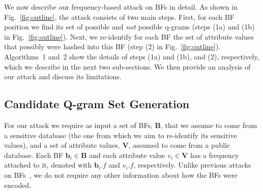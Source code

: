 \documentclass{llncs}
\begin{document}

We now describe our frequency-based attack on BFs in detail. As shown
in Fig.~\ref{fig:outline}, the attack consists of two main steps.
First, for each BF position we find its set of possible and
\emph{not} possible q-grams
(steps (1a) and (1b) in Fig.~\ref{fig:outline}).
%
Next, 
we re-identify for each BF  
the set of attribute values
that possibly were hashed into this BF (step (2) in
Fig.~\ref{fig:outline}).
%
Algorithms~1 and~2 show the details of steps (1a) and (1b), and (2),
respectively, which we describe in the next two sub-sections. We then
provide an analysis of our attack and discuss its limitations.


\subsection{Candidate Q-gram Set Generation}
\label{sec-cand-q-gram}

For our attack we require as input a set of BFs, $\mathbf{B}$, that
we assume to come from a sensitive database (the one from which we
aim to re-identify its sensitive values), and a set of attribute
values, $\mathbf{V}$, assumed to come from a public database. Each BF
$\mathbf{b}_i \in \mathbf{B}$ and each attribute value $v_i \in
\mathbf{V}$ has a frequency attached to it, denoted with
$\mathbf{b}_i.f$ and $v_i.f$, respectively. Unlike previous attacks on
BFs~\cite{Kuz11,Kuz13,Nie14}, we do not require any other information
about how the BFs were encoded.
\end{document}
